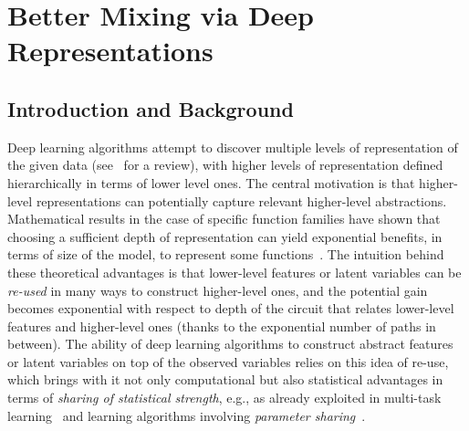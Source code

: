 \vspace*{-1mm}
\fi

\chapter{Better Mixing via Deep Representations}
\section{Introduction and Background}

Deep learning algorithms attempt to discover multiple levels of
representation of the given data (see~\citep{Bengio-2009} for a review),
with higher levels of representation defined hierarchically in terms of
lower level ones. The central motivation is that higher-level
representations can potentially capture relevant higher-level abstractions.
Mathematical results in the case of
specific function families have shown that choosing a sufficient depth of
representation can yield exponential benefits, in terms of
size of the model, to represent some
functions~\citep{Hastad86,Hastad91,Bengio-localfailure-NIPS-2006,Bengio+Lecun-chapter2007,Bengio+Delalleau-ALT-2011}. The intuition
behind these theoretical advantages is that lower-level features or latent
variables can be {\em re-used} in many ways to construct higher-level ones,
and the potential gain becomes exponential with respect to depth of the
circuit that relates lower-level features and higher-level ones (thanks to
the exponential number of paths in between). The ability of deep learning
algorithms to construct abstract features or latent variables on top of the
observed variables relies on this idea of re-use, which
brings with it not only computational but also statistical advantages in
terms of {\em sharing of statistical strength}, e.g., as already exploited in 
multi-task learning~\citep{caruana95,baxter97,CollobertR2008} and
learning algorithms involving {\em parameter
  sharing}~\citep{Lang+Hinton88,LeCun89a}.

